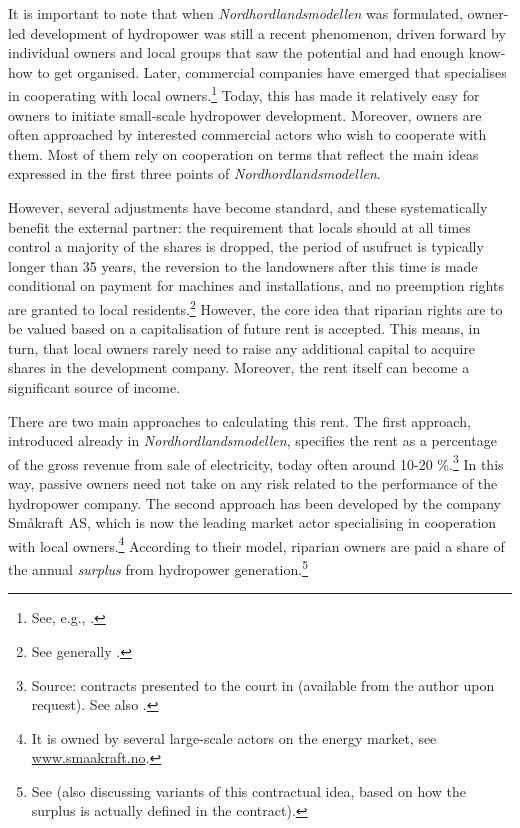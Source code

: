 It is important to note that when {\it Nordhordlandsmodellen} was formulated, owner-led development of hydropower was still a recent phenomenon, driven forward by individual owners and local groups that saw the potential and had enough know-how to get organised. Later, commercial companies have emerged that specialises in cooperating with local owners.\footnote{See, e.g., \cite{larsen06}.} Today, this has made it relatively easy for owners to initiate small-scale hydropower development. Moreover, owners are often approached by interested commercial actors who wish to cooperate with them. Most of them rely on cooperation on terms that reflect the main ideas expressed in the first three points of {\it Nordhordlandsmodellen}.

However, several adjustments have become standard, and these systematically benefit the external partner: the requirement that locals should at all times control a majority of the shares is dropped, the period of usufruct is typically longer than 35 years, the reversion to the landowners after this time is made conditional on payment for machines and installations, and no preemption rights are granted to local residents.\footnote{See generally \cite{hauge15}.} However, the core idea that riparian rights are to be valued based on a capitalisation of future rent is accepted. This means, in turn, that local owners rarely need to raise any additional capital to acquire shares in the development company. Moreover, the rent itself can become a significant source of income.

There are two main approaches to calculating this rent. The first approach, introduced already in {\it Nordhordlandsmodellen}, specifies the rent as a percentage of the gross revenue from sale of electricity, today often around 10-20 \%.\footnote{Source: contracts presented to the court in \cite{sauda09} (available from the author upon request). See also \cite[55-57]{hauge15}.} In this way, passive owners need not take on any risk related to the performance of the hydropower company. The second approach has been developed by the company Småkraft AS, which is now the leading market actor specialising in cooperation with local owners.\footnote{It is owned by several large-scale actors on the energy market, see \url{www.smaakraft.no}.} According to their model, riparian owners are paid a share of the annual {\it surplus} from hydropower generation.\footnote{See \cite[57-60]{hauge15} (also discussing variants of this contractual idea, based on how the surplus is actually defined in the contract).}

